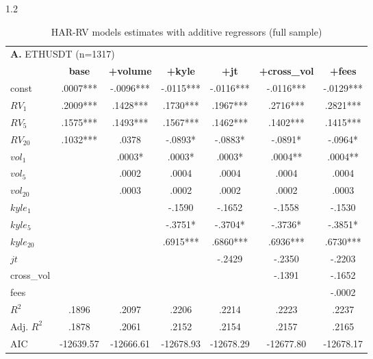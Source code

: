 \documentclass[10pt]{article}
\begin{document}
\begin{setstretch}{1.2}
\begin{table}[!htbp]
\centering
\small
\caption{HAR-RV models estimates with additive regressors (full sample)}
\vspace{8pt}
\label{tab:additive_full}
\renewcommand{\arraystretch}{1.3}
\begin{tabular}{l*{6}{c}}
\multicolumn{7}{l}{\textbf{A.} ETHUSDT (n=1317)} \\
& \textbf{base} & \textbf{+volume} & \textbf{+kyle} & \textbf{+jt} & \textbf{+cross\_vol} & \textbf{+fees} \\
\hline
const & \hfil .0007*** & \hfil -.0096*** & \hfil -.0115*** & \hfil -.0116*** & \hfil -.0116*** & \hfil -.0129*** \\
$RV_1$ & \hfil .2009*** & \hfil .1428*** & \hfil .1730*** & \hfil .1967*** & \hfil .2716*** & \hfil .2821*** \\
$RV_5$ & \hfil .1575*** & \hfil .1493*** & \hfil .1567*** & \hfil .1462*** & \hfil .1402*** & \hfil .1415*** \\
$RV_{20}$ & \hfil .1032*** & \hfil .0378 & \hfil -.0893* & \hfil -.0883* & \hfil -.0891* & \hfil -.0964* \\
$vol_1$ & & \hfil .0003* & \hfil .0003* & \hfil .0003* & \hfil .0004** & \hfil .0004** \\
$vol_5$ & & \hfil .0002 & \hfil .0004 & \hfil .0004 & \hfil .0004 & \hfil .0004 \\
$vol_{20}$ & & \hfil .0003 & \hfil .0002 & \hfil .0002 & \hfil .0002 & \hfil .0003 \\
$kyle_1$ & & & \hfil -.1590 & \hfil -.1652 & \hfil -.1558 & \hfil -.1530 \\
$kyle_5$ & & & \hfil -.3751* & \hfil -.3704* & \hfil -.3736* & \hfil -.3851* \\
$kyle_{20}$ & & & \hfil .6915*** & \hfil .6860*** & \hfil .6936*** & \hfil .6730*** \\
$jt$ & & & & \hfil -.2429 & \hfil -.2350 & \hfil -.2203 \\
cross\_vol & & & & & \hfil -.1391 & \hfil -.1652 \\
fees & & & & & & \hfil -.0002 \\
\hline
$R^2$ & \hfil .1896 & \hfil .2097 & \hfil .2206 & \hfil .2214 & \hfil .2223 & \hfil .2237 \\
Adj. $R^2$ & \hfil .1878 & \hfil .2061 & \hfil .2152 & \hfil .2154 & \hfil .2157 & \hfil .2165 \\
AIC & \hfil -12639.57 & \hfil -12666.61 & \hfil -12678.93 & \hfil -12678.29 & \hfil -12677.80 & \hfil -12678.17 \\

\end{tabular}
\end{table}
\end{setstretch}
\end{document}

